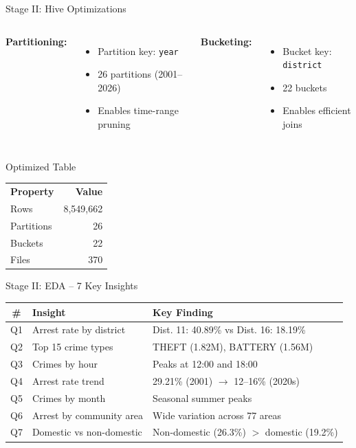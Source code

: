 \documentclass[10pt]{beamer}
\begin{document}
\begin{frame}{Stage II: Hive Optimizations}
\begin{columns}
\textbf{Partitioning:}
\begin{itemize}
    \item Partition key: \texttt{year}
    \item 26 partitions (2001--2026)
    \item Enables time-range pruning
\end{itemize}

\textbf{Bucketing:}
\begin{itemize}
    \item Bucket key: \texttt{district}
    \item 22 buckets
    \item Enables efficient joins
\end{itemize}
\end{columns}

\vspace{0.3cm}
\begin{block}{Optimized Table}
\begin{tabular}{lr}
\textbf{Property} & \textbf{Value} \\
Rows & 8,549,662 \\
Partitions & 26 \\
Buckets & 22 \\
Files & 370 \\
\end{tabular}
\end{block}
\end{frame}

\begin{frame}{Stage II: EDA -- 7 Key Insights}
\begin{table}
\centering
\begin{tabular}{cll}
\toprule
\textbf{\#} & \textbf{Insight} & \textbf{Key Finding} \\
\midrule
Q1 & Arrest rate by district & Dist. 11: 40.89\% vs Dist. 16: 18.19\% \\
Q2 & Top 15 crime types & THEFT (1.82M), BATTERY (1.56M) \\
Q3 & Crimes by hour & Peaks at 12:00 and 18:00 \\
Q4 & Arrest rate trend & 29.21\% (2001) $\rightarrow$ 12--16\% (2020s) \\
Q5 & Crimes by month & Seasonal summer peaks \\
Q6 & Arrest by community area & Wide variation across 77 areas \\
Q7 & Domestic vs non-domestic & Non-domestic (26.3\%) $>$ domestic (19.2\%) \\
\bottomrule
\end{tabular}
\end{table}
\end{frame}
\end{document}
